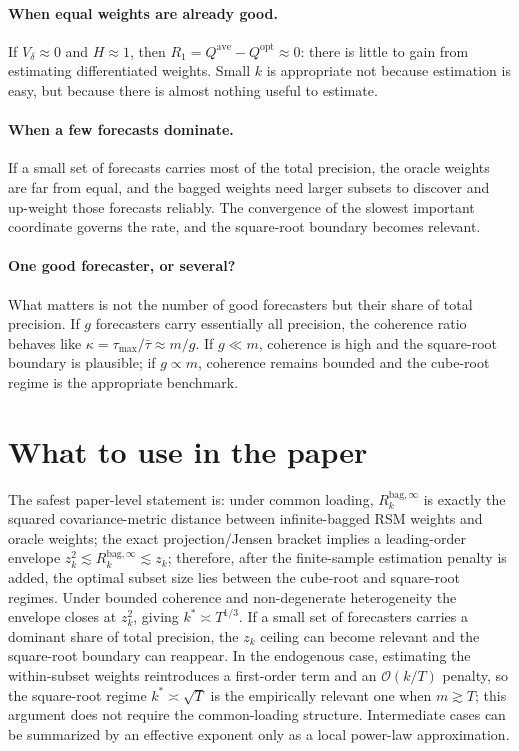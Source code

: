 \documentclass[11pt]{article}
\newcommand{\Rbag}{R_k^{\mathrm{bag},\infty}}
\newcommand{\Qopt}{Q^{\mathrm{opt}}}
\newcommand{\Qave}{Q^{\mathrm{ave}}}
\begin{document}
\paragraph{When equal weights are already good.} If $V_\delta\approx0$ and $H\approx1$, then
$R_1=\Qave-\Qopt\approx0$: there is little to gain from estimating differentiated weights.
Small $k$ is appropriate not because estimation is easy, but because there is almost nothing
useful to estimate.

\paragraph{When a few forecasts dominate.} If a small set of forecasts carries most of the
total precision, the oracle weights are far from equal, and the bagged weights need larger
subsets to discover and up-weight those forecasts reliably. The convergence of the slowest
important coordinate governs the rate, and the square-root boundary becomes relevant.

\paragraph{One good forecaster, or several?} What matters is not the number of good
forecasters but their share of total precision. If $g$ forecasters carry essentially all
precision, the coherence ratio behaves like $\kappa=\tau_{\max}/\bar\tau\approx m/g$. If
$g\ll m$, coherence is high and the square-root boundary is plausible; if $g\propto m$,
coherence remains bounded and the cube-root regime is the appropriate benchmark.

\section{What to use in the paper}
The safest paper-level statement is: under common loading, $\Rbag$ is exactly the squared
covariance-metric distance between infinite-bagged RSM weights and oracle weights; the exact
projection/Jensen bracket implies a leading-order envelope $z_k^2\lesssim\Rbag\lesssim z_k$;
therefore, after the finite-sample estimation penalty is added, the optimal subset size lies
between the cube-root and square-root regimes. Under bounded coherence and non-degenerate
heterogeneity the envelope closes at $z_k^2$, giving $k^\ast\asymp T^{1/3}$. If a small set of
forecasters carries a dominant share of total precision, the $z_k$ ceiling can become relevant
and the square-root boundary can reappear. In the endogenous case, estimating the within-subset
weights reintroduces a first-order term and an $\mathcal O(k/T)$ penalty, so the square-root
regime $k^\ast\asymp\sqrt T$ is the empirically relevant one when $m\gtrsim T$; this argument
does not require the common-loading structure. Intermediate cases can be summarized by an
effective exponent only as a local power-law approximation.
\end{document}
